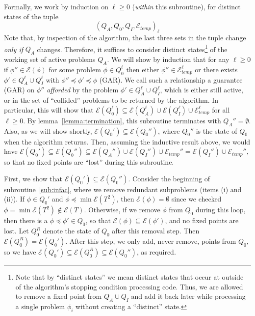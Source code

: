 \documentclass[11pt,reqno]{amsart}
\theoremstyle{definition}
\numberwithin{equation}{section}
\newcommand{\ul}{\underline}
\newcommand{\pre}{\phi}
\newcommand{\sub}{\subseteq}
\newcommand{\fix}{\mathcal{E}}
\newcommand{\peq}{\preceq}
\newcommand{\bopre}{\ul{\pre}}
\newcommand{\acto}{Q_0}
\newcommand{\acta}{Q_A}
\newcommand{\actc}{Q_I}
\newcommand{\fixtemp}{\mathcal{E}_{temp}}
\newcommand{\infacredi}{(i)\xspace}
\newcommand{\infacredii}{(ii)\xspace}
\begin{document}
Formally, we work by induction on $\ell \geq 0$ (\emph{within} this subroutine), for distinct states of the tuple \[(\acta,\acto,\actc,\fixtemp)_{\ell}\]
Note that, by inspection of the algorithm, the last three sets in the tuple change \emph{only if} $\acta$ changes. 
Therefore, it suffices to consider distinct states\footnote{Note that by ``distinct states'' we mean distinct states that occur at outside of the algorithm's stopping condition processing code.
Thus, we are allowed to remove a fixed point from $\acta \cup \actc$ and add it back later while processing a single problem $\pre_i$ without creating a ``distinct'' state.} of the working set of active problems $\acta$.
We will show by induction that for any $\ell \geq 0$ if $\pre'' \in \fix(\pre)$ for some problem $\pre \in \acto^{\ell}$ then either $\pre'' \in \fixtemp^{\ell}$ or there exists $\pre' \in \acta^{\ell} \cup \actc^{\ell}$ with $\pre'' \peq \pre' \peq \pre$ (GAR).
We call such a relationship a guarantee (GAR) on $\pre''$ \emph{afforded} by the problem $\pre' \in \acta^{\ell} \cup \actc^{\ell}$, which is either still active, or in the set of ``collided'' problems to be returned by the algorithm.
In particular, this will show that $\fix(\acto^{\ell}) \sub \fix(\acta^{\ell}) \cup \fix(\actc^{\ell}) \cup \fixtemp^{\ell}$ for all $\ell \geq 0$.
By lemma~\ref{lemma:termination}, this subroutine terminates with $\acta'' = \emptyset$. 
Also, as we will show shortly, $\fix(\acto') \sub \fix(\acto'')$, where $\acto''$ is the state of $\acto$ when the algorithm returns. 
Then, assuming the inductive result above, we would have $\fix(\acto') \sub \fix(\acto'') \sub \fix(\acta'') \cup \fix(\actc'') \cup \fixtemp'' = \fix(\actc'') \cup \fixtemp''$, so that no fixed points are ``lost'' during this subroutine.

First, we show that $\fix(\acto') \sub \fix(\acto'')$. 
Consider the beginning of subroutine~\ref{sub:infac}, where we remove redundant subproblems (items \infacredi and \infacredii).
If $\pre \in \acto'$ and $\pre \peq \min \fix(T^2)$, then $\fix(\pre) = \emptyset$ since we checked $\bopre = \min \fix(T^2) \not \in \fix(T)$. 
Otherwise, if we remove $\pre$ from $\acto$ during this loop, then there is a $\pre \peq \pre' \in \acto$, so that $\fix(\pre) \sub \fix(\pre')$, and no fixed points are lost.
Let $\acto^R$ denote the state of $\acto$ after this removal step.
Then $\fix(\acto^R) = \fix(\acto')$.
After this step, we only add, never remove, points from $\acto$, so we have $\fix(\acto') \sub \fix(\acto^R) \sub \fix(\acto'')$, as required.
\end{document}
